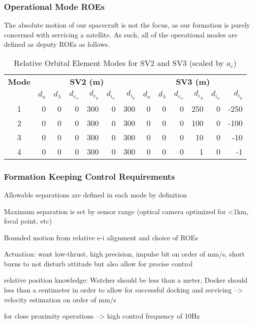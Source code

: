 \subsubsection{Operational Mode ROEs}
The absolute motion of our spacecraft is not the focus, as our formation is purely concerned with servicing a satellite. As such, all of the operational modes are defined as deputy ROEs as follows. 

\begin{table}[h!]
\centering
\begin{tabular}{|c|rrrrrr|rrrrrr|}
\hline
\textbf{Mode} & \multicolumn{6}{c|}{\textbf{SV2 (m)}} & \multicolumn{6}{c|}{\textbf{SV3 (m)}} \\
\cline{2-13}
 & $d_a$ & $d_\lambda$ & $d_{e_x}$ & $d_{e_y}$ & $d_{i_x}$ & $d_{i_y}$ 
 & $d_a$ & $d_\lambda$ & $d_{e_x}$ & $d_{e_y}$ & $d_{i_x}$ & $d_{i_y}$ \\
\hline
1 & 0 & 0 & 0 & 300 & 0 & 300 & 0 & 0 & 0 & 250 & 0 & -250 \\
2 & 0 & 0 & 0 & 300 & 0 & 300 & 0 & 0 & 0 & 100 & 0 & -100 \\
3 & 0 & 0 & 0 & 300 & 0 & 300 & 0 & 0 & 0 & 10  & 0 & -10 \\
4 & 0 & 0 & 0 & 300 & 0 & 300 & 0 & 0 & 0 & 1   & 0 & -1 \\
\hline
\end{tabular}
\caption{Relative Orbital Element Modes for SV2 and SV3 (scaled by $a_c$)}
\label{tab:roe_modes}
\end{table}

\subsubsection{Formation Keeping Control Requirements}
Allowable separations are defined in each mode by definition

Maximum separation is set by sensor range (optical camera optimized for <1km, focal point, etc)

Bounded motion from relative e-i alignment and choice of ROEs

Actuation: want low-thrust, high precision, impulse bit on order of mm/s, short burns to not disturb attitude but also allow for precise control

relative position knowledge: Watcher should be less than a meter, Docker should less than a centimeter in order to allow for successful docking and servicing --> velocity estimation on order of mm/s

for close proximity operations --> high control frequency of 10Hz



